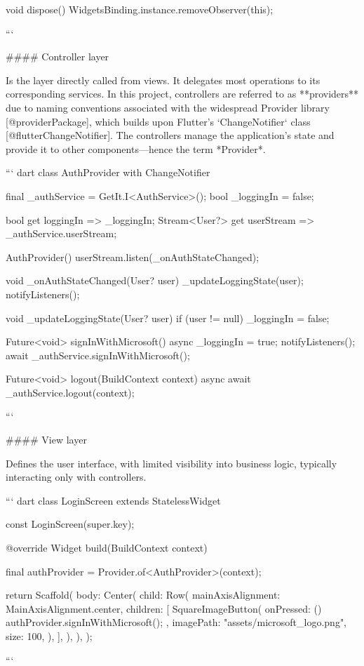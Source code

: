 \documentclass[
  digital,     %
  oneside,     %
  nosansbold,  %
  nocolorbold, %
  lof,         %
  lot,         %
]{fithesis4}
\begin{document}
\begin{markdown}
{  void dispose() {
    WidgetsBinding.instance.removeObserver(this);
  }
}

```

#### Controller layer

Is the layer directly called from views. It delegates most operations to its corresponding services. In this project, controllers are referred to as **providers** due to naming conventions associated with the widespread Provider library [@providerPackage], which builds upon Flutter's `ChangeNotifier` class [@flutterChangeNotifier].  
The controllers manage the application's state and provide it to other components—hence the term *Provider*.

``` dart
class AuthProvider with ChangeNotifier {
  final _authService = GetIt.I<AuthService>();
  bool _loggingIn = false;

  bool get loggingIn => _loggingIn;
  Stream<User?> get userStream => _authService.userStream;

  AuthProvider() {
    userStream.listen(_onAuthStateChanged);
  }

  void _onAuthStateChanged(User? user) {
    _updateLoggingState(user);
    notifyListeners();
  }

  void _updateLoggingState(User? user) {
    if (user != null) {
      _loggingIn = false;
    }
  }

  Future<void> signInWithMicrosoft() async {
    _loggingIn = true;
    notifyListeners();
    await _authService.signInWithMicrosoft();
  }

  Future<void> logout(BuildContext context) async {
    await _authService.logout(context);
  }
}
```

#### View layer

Defines the user interface, with limited visibility into business logic, typically interacting only with controllers.

``` dart
class LoginScreen extends StatelessWidget {
  const LoginScreen({super.key});

  @override
  Widget build(BuildContext context) {
    final authProvider = Provider.of<AuthProvider>(context);

    return Scaffold(
      body: Center(
        child: Row(
          mainAxisAlignment: MainAxisAlignment.center,
          children: [
            SquareImageButton(
              onPressed: () {
                authProvider.signInWithMicrosoft();
              },
              imagePath: "assets/microsoft_logo.png",
              size: 100,
            ),
          ],
        ),
      ),
    );
  }
}
```


\end{markdown}
\end{document}
